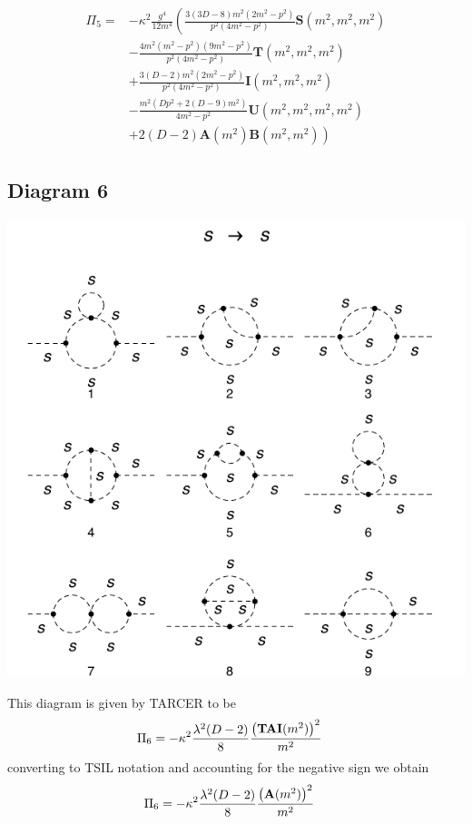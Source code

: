 \documentclass[11pt]{article}
\newcommand{\tsil}{\textsf{TSIL} }
\newcommand{\tarcer}{\textsf{TARCER} }
\begin{document}
\begin{align}
\begin{split}
\Pi_5 =& - \kappa^2 \frac{g^4}{12 m^4} \left( \frac{3(3D-8)m^2(2m^2-p^2)}{p^2(4m^2-p^2)}\mathbf{S}(m^2,m^2,m^2)\right. \\
&-\frac{4m^2(m^2-p^2)(9m^2-p^2)}{p^2(4m^2-p^2)}\mathbf{T}(m^2,m^2,m^2)\\
&+\frac{3(D-2)m^2(2m^2-p^2)}{p^2(4m^2-p^2)}\mathbf{I}(m^2,m^2,m^2)\\
&-\frac{m^2(D p^2+2(D-9)m^2)}{4m^2-p^2}\mathbf{U}(m^2,m^2,m^2,m^2)\\
&\left.+2(D-2)\mathbf{A}(m^2) \mathbf{B}(m^2,m^2) \right)
\end{split}
\end{align}


\subsection*{Diagram 6}
\noindent\begin{minipage}{0.3\textwidth}
\begin{center}
\includegraphics{2loop_6.pdf}
\end{center}
\end{minipage}
\noindent\begin{minipage}{0.7\textwidth}
This diagram is given by \tarcer to be
\begin{align}
\Pi_6 &= -\kappa^2 \frac{\lambda^2(D-2)}{8}\frac{ \left({\tt{\mathbf{TAI}}} (m^2)\right)^2}{ m^2 }  
\end{align}
converting to \tsil notation and accounting for the negative sign we obtain
\begin{align}
\Pi_6 &=- \kappa^2 \frac{\lambda^2(D-2)}{8}\frac{ \left({\tt{\mathbf{A}}} (m^2)\right)^2}{ m^2 }  
\end{align}
\end{minipage}
\end{document}
